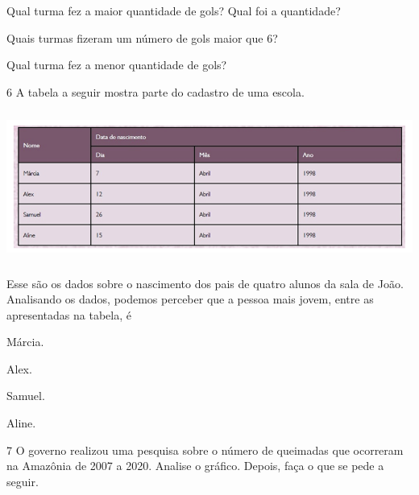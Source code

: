 \begin{mdframed}[linewidth=2pt,linecolor=salmao,roundcorner=2pt]
\begin{escolha}
{\begin{escolha}
\item
  Qual turma fez a maior quantidade de gols? Qual foi a quantidade?


\item
  Quais turmas fizeram um número de gols maior que 6?


\item
  Qual turma fez a menor quantidade de gols?

\end{escolha}

\num{6} A tabela a seguir mostra parte do cadastro de uma escola.

\includegraphics[width=5.90556in,height=1.93264in]{media/image98.png}


Esse são os dados sobre o nascimento dos pais de quatro alunos da sala
de João. Analisando os dados, podemos perceber que a pessoa mais jovem,
entre as apresentadas na tabela, é

\begin{escolha}
\item
  Márcia.
\item
  Alex.
\item
  Samuel.
\item
  Aline.
\end{escolha}


\num{7} O governo realizou uma pesquisa sobre o número de queimadas que
ocorreram na Amazônia de 2007 a 2020. Analise o gráfico. Depois, faça o que se pede a seguir.

}
\end{escolha}
\end{mdframed}
